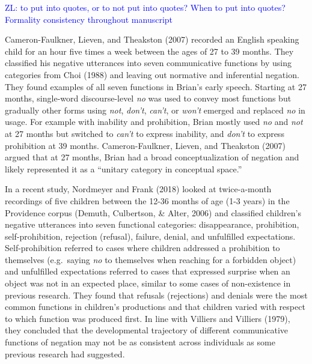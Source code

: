 \documentclass[
  english,
  man,floatsintext]{apa6}
\begin{document}
\textcolor{blue}{ZL: to put into quotes, or to not put into quotes? When to put into quotes? Formality consistency throughout manuscript}

Cameron-Faulkner, Lieven, and Theakston (2007) recorded an English speaking child for an hour five times a week between the ages of 27 to 39 months. They classified his negative utterances into seven communicative functions by using categories from Choi (1988) and leaving out normative and inferential negation. They found examples of all seven functions in Brian's early speech. Starting at 27 months, single-word discourse-level \emph{no} was used to convey most functions but gradually other forms using \emph{not}, \emph{don't}, \emph{can't}, or \emph{won't} emerged and replaced \emph{no} in usage. For example with inability and prohibition, Brian mostly used \emph{no} and \emph{not} at 27 months but switched to \emph{can't} to express inability, and \emph{don't} to express prohibition at 39 months. Cameron-Faulkner, Lieven, and Theakston (2007) argued that at 27 months, Brian had a broad conceptualization of negation and likely represented it as a ``unitary category in conceptual space.''

In a recent study, Nordmeyer and Frank (2018) looked at twice-a-month recordings of five children between the 12-36 months of age (1-3 years) in the Providence corpus (Demuth, Culbertson, \& Alter, 2006) and classified children's negative utterances into seven functional categories: disappearance, prohibition, self-prohibition, rejection (refusal), failure, denial, and unfulfilled expectations. Self-prohibition referred to cases where children addressed a prohibition to themselves (e.g.~saying \emph{no} to themselves when reaching for a forbidden object) and unfulfilled expectations referred to cases that expressed surprise when an object was not in an expected place, similar to some cases of non-existence in previous research. They found that refusals (rejections) and denials were the most common functions in children's productions and that children varied with respect to which function was produced first. In line with Villiers and Villiers (1979), they concluded that the developmental trajectory of different communicative functions of negation may not be as consistent across individuals as some previous research had suggested.
\end{document}
